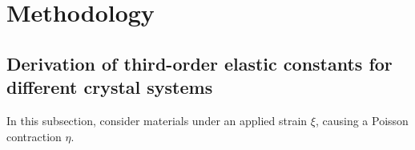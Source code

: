 \documentclass[showpacs,aps,floatfix,prb,reprint,superscriptaddress]{revtex4-1}
\begin{document}
%

\section{Methodology}
\subsection{Derivation of third-order elastic constants for different crystal systems}
In this subsection, consider materials under an applied strain $\xi$, causing a Poisson contraction $\eta$.
\end{document}
